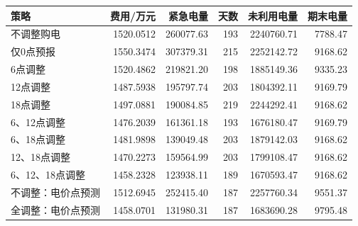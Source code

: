 \begin{tabular}{lrrrrr}
\toprule
策略 & 费用/万元 & 紧急电量 & 天数 & 未利用电量 & 期末电量 \\
\midrule
不调整购电 & 1520.0512 & 260077.63 & 193 & 2240760.71 & 7788.47 \\
仅0点预报 & 1550.3474 & 307379.31 & 215 & 2252142.72 & 9168.62 \\
6点调整 & 1520.4862 & 219821.20 & 198 & 1885149.36 & 9335.23 \\
12点调整 & 1487.5938 & 195797.74 & 203 & 1804392.11 & 9169.79 \\
18点调整 & 1497.0881 & 190084.85 & 219 & 2244292.41 & 9168.62 \\
6、12点调整 & 1476.2039 & 161361.18 & 193 & 1676180.47 & 9169.79 \\
6、18点调整 & 1481.9898 & 139049.48 & 203 & 1879142.03 & 9168.62 \\
12、18点调整 & 1470.2273 & 159564.99 & 203 & 1799108.47 & 9168.62 \\
6、12、18点调整 & 1458.2328 & 123938.11 & 189 & 1670593.47 & 9168.62 \\
不调整：电价点预测 & 1512.6945 & 252415.40 & 187 & 2257760.34 & 9551.37 \\
全调整：电价点预测 & 1458.0701 & 131980.31 & 187 & 1683690.28 & 9795.48 \\
\bottomrule
\end{tabular}
